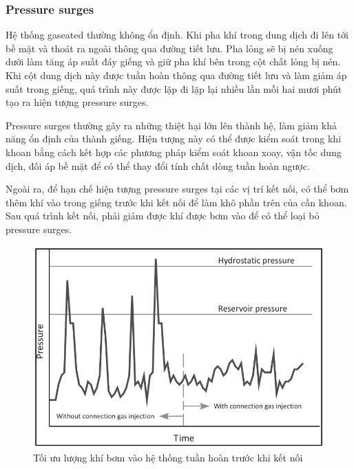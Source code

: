 \documentclass[13pt,a4paper]{article}
\begin{document}
	\subsubsection{Pressure surges}
	Hệ thống gaseated thường không ổn định. Khi pha khí trong dung dịch đi lên tới bề mặt và thoát ra ngoài thông qua đường tiết lưu. Pha lỏng sẽ bị nén xuống dưới làm tăng áp suất đáy giếng và giữ pha khí bên trong cột chất lỏng bị nén. Khi cột dung dịch này được tuần hoàn thông qua đường tiết lưu và làm giảm áp suất trong giếng, quá trình này được lặp đi lặp lại nhiều lần mỗi hai mươi phút tạo ra hiện tượng pressure surges.\par
	Pressure surges thường gây ra những thiệt hại lớn lên thành hệ, làm giảm khả năng ổn định của thành giếng. Hiện tượng này có thể được kiểm soát trong khi khoan bằng cách kết hợp các phương pháp kiểm soát khoan xoay, vận tốc dung dịch, đối áp bề mặt để có thể thay đổi tính chất dòng tuần hoàn ngược.\par
	Ngoài ra, để hạn chế hiện tượng pressure surges tại các vị trí kết nối, có thể bơm thêm khí vào trong giếng trước khi kết nối để làm khô phần trên của cần khoan. Sau quá trình kết nối, phải giảm được khí được bơm vào để có thể loại bỏ pressure surges.
	\begin{figure}
	\centering
	\includegraphics[scale=0.5]{Figs/Fig12.PNG}
	\caption{Tối ưu lượng khí bơm vào hệ thống tuần hoàn trước khi kết nối}
	\end{figure}
\end{document}

